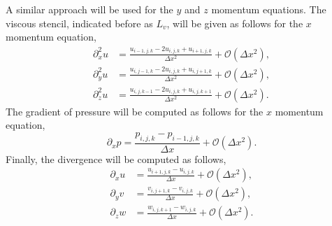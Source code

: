 \documentclass[fleqn,a4paper]{article} %
\numberwithin{equation}{section} %
\numberwithin{figure}{section} %
\numberwithin{algorithm}{section} %
\begin{document}
A similar approach will be used for the $y$ and $z$ momentum equations. The viscous stencil, indicated before as $L_v$, will be given as follows for the $x$ momentum equation,
\begin{equation}
\begin{split}
    \partial_x^2 u &= \frac{u_{i - 1, j, k} - 2 u_{i, j, k} + u_{i + 1, j, k}}{\Delta x ^2} + \mathcal{O}\left(\Delta x^2\right),\\
    \partial_y^2 u &= \frac{u_{i, j-1, k} - 2 u_{i, j, k} + u_{i, j+1, k}}{\Delta x ^2} + \mathcal{O}\left(\Delta x^2\right),\\
    \partial_z^2 u &= \frac{u_{i, j, k-1} - 2 u_{i, j, k} + u_{i, j, k+1}}{\Delta x ^2} + \mathcal{O}\left(\Delta x^2\right).
\end{split}
\end{equation}
The gradient of pressure will be computed as follows for the $x$ momentum equation,
\begin{equation}
    \partial_x p = \frac{p_{i,j,k} - p_{i-1, j, k}}{\Delta x} + \mathcal{O}\left(\Delta x^2\right).
\end{equation}
Finally, the divergence will be computed as follows,
\begin{equation}
\begin{split}
    \partial_x u &= \frac{u_{i+1, j, k} - u_{i, j, k}}{\Delta x}+ \mathcal{O}\left(\Delta x^2\right),\\
    \partial_y v &= \frac{v_{i, j+1, k} - v_{i, j, k}}{\Delta x}+ \mathcal{O}\left(\Delta x^2\right),\\
    \partial_z w &= \frac{w_{i, j, k+1} - w_{i, j, k}}{\Delta x}+ \mathcal{O}\left(\Delta x^2\right).
\end{split}
\end{equation}
\end{document}

